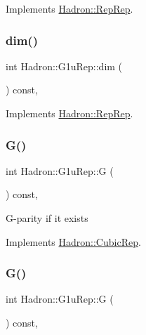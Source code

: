 Implements \mbox{\hyperlink{structHadron_1_1RepRep_a92c8802e5ed7afd7da43ccfd5b7cd92b}{Hadron\+::\+Rep\+Rep}}.

\mbox{\label{structHadron_1_1G1uRep_a13d30ff40203d77d9beacee3e48dbbd7}} 
\subsubsection{\texorpdfstring{dim()}{dim()}\hspace{0.1cm}{\footnotesize\ttfamily [3/3]}}
{\footnotesize\ttfamily int Hadron\+::\+G1u\+Rep\+::dim (\begin{DoxyParamCaption}{ }\end{DoxyParamCaption}) const\hspace{0.3cm}{\ttfamily [inline]}, {\ttfamily [virtual]}}



Implements \mbox{\hyperlink{structHadron_1_1RepRep_a92c8802e5ed7afd7da43ccfd5b7cd92b}{Hadron\+::\+Rep\+Rep}}.

\mbox{\label{structHadron_1_1G1uRep_a458d6b9eaf24491739d751fb9227a27e}} 
\subsubsection{\texorpdfstring{G()}{G()}\hspace{0.1cm}{\footnotesize\ttfamily [1/2]}}
{\footnotesize\ttfamily int Hadron\+::\+G1u\+Rep\+::G (\begin{DoxyParamCaption}{ }\end{DoxyParamCaption}) const\hspace{0.3cm}{\ttfamily [inline]}, {\ttfamily [virtual]}}

G-\/parity if it exists 

Implements \mbox{\hyperlink{structHadron_1_1CubicRep_a52104e43266d1614c00bbd1c3b395458}{Hadron\+::\+Cubic\+Rep}}.

\mbox{\label{structHadron_1_1G1uRep_a458d6b9eaf24491739d751fb9227a27e}} 
\subsubsection{\texorpdfstring{G()}{G()}\hspace{0.1cm}{\footnotesize\ttfamily [2/2]}}
{\footnotesize\ttfamily int Hadron\+::\+G1u\+Rep\+::G (\begin{DoxyParamCaption}{ }\end{DoxyParamCaption}) const\hspace{0.3cm}{\ttfamily [inline]}, {\ttfamily [virtual]}}

